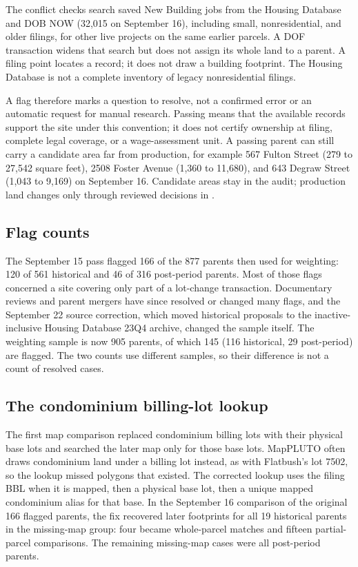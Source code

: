 The conflict checks search saved New Building jobs from the Housing Database
and DOB NOW (32,015 on September 16), including small, nonresidential, and
older filings, for other live projects on the same earlier parcels. A DOF
transaction widens that search but does not assign its whole land to a parent.
A filing point locates a record; it does not draw a building footprint. The
Housing Database is not a complete inventory of legacy nonresidential filings.

A flag therefore marks a question to resolve, not a confirmed error or an
automatic request for manual research. Passing means that the available records
support the site under this convention; it does not certify ownership at
filing, complete legal coverage, or a wage-assessment unit. A passing parent
can still carry a candidate area far from production, for example 567 Fulton
Street (279 to 27,542 square feet), 2508 Foster Avenue (1,360 to 11,680), and
643 Degraw Street (1,043 to 9,169) on September 16. Candidate areas stay in the
audit; production land changes only through reviewed decisions in
.

\subsection*{Flag counts}

The September 15 pass flagged 166 of the 877 parents then used for weighting:
120 of 561 historical and 46 of 316 post-period parents. Most of those flags
concerned a site covering only part of a lot-change transaction. Documentary
reviews and parent mergers have since resolved or changed many flags, and the
September 22 source correction, which moved historical proposals to the
inactive-inclusive Housing Database 23Q4 archive, changed the sample itself.
The weighting sample is now 905 parents, of which 145
(116 historical, 29 post-period) are flagged. The two counts use different
samples, so their difference is not a count of resolved cases.

\subsection*{The condominium billing-lot lookup}

The first map comparison replaced condominium billing lots with their physical
base lots and searched the later map only for those base lots. MapPLUTO often
draws condominium land under a billing lot instead, as with Flatbush's lot
7502, so the lookup missed polygons that existed. The corrected lookup uses the
filing BBL when it is mapped, then a physical base lot, then a unique mapped
condominium alias for that base. In the September 16 comparison of the original
166 flagged parents, the fix recovered later footprints for all 19 historical
parents in the missing-map group: four became whole-parcel matches and fifteen
partial-parcel comparisons. The remaining missing-map cases were all
post-period parents.

